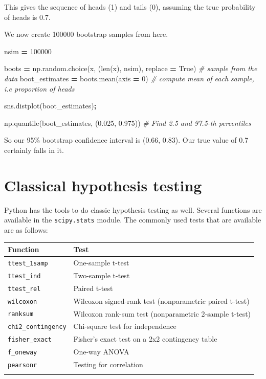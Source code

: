 \documentclass[
  letterpaper,
]{scrbook}
\newenvironment{Shaded}{\begin{snugshade}}{\end{snugshade}}
\newcommand{\BuiltInTok}[1]{#1}
\newcommand{\CommentTok}[1]{\textcolor[rgb]{0.56,0.35,0.01}{\textit{#1}}}
\newcommand{\DecValTok}[1]{\textcolor[rgb]{0.00,0.00,0.81}{#1}}
\newcommand{\FloatTok}[1]{\textcolor[rgb]{0.00,0.00,0.81}{#1}}
\newcommand{\NormalTok}[1]{#1}
\newcommand{\OperatorTok}[1]{\textcolor[rgb]{0.81,0.36,0.00}{\textbf{#1}}}
\newcommand{\VariableTok}[1]{\textcolor[rgb]{0.00,0.00,0.00}{#1}}
\begin{document}
This gives the sequence of heads (1) and tails (0), assuming the true probability of heads is 0.7.

We now create 100000 bootstrap samples from here.

\begin{Shaded}
\begin{Highlighting}[]
\NormalTok{nsim }\OperatorTok{=} \DecValTok{100000}

\NormalTok{boots }\OperatorTok{=}\NormalTok{ np.random.choice(x, (}\BuiltInTok{len}\NormalTok{(x), nsim), replace }\OperatorTok{=} \VariableTok{True}\NormalTok{) }\CommentTok{\# sample from the data}
\NormalTok{boot\_estimates }\OperatorTok{=}\NormalTok{ boots.mean(axis }\OperatorTok{=} \DecValTok{0}\NormalTok{) }\CommentTok{\# compute mean of each sample, i.e proportion of heads}

\NormalTok{sns.distplot(boot\_estimates)}\OperatorTok{;}
\end{Highlighting}
\end{Shaded}

\begin{Shaded}
\begin{Highlighting}[]
\NormalTok{np.quantile(boot\_estimates, (}\FloatTok{0.025}\NormalTok{, }\FloatTok{0.975}\NormalTok{)) }\CommentTok{\# Find 2.5 and 97.5{-}th percentiles}
\end{Highlighting}
\end{Shaded}

So our 95\% bootstrap confidence interval is (0.66, 0.83). Our true value of 0.7 certainly falls in it.

\hypertarget{classical-hypothesis-testing}{%
\section{Classical hypothesis testing}\label{classical-hypothesis-testing}}

Python has the tools to do classic hypothesis testing as well. Several functions are available in the \texttt{scipy.stats} module. The commonly used tests that are available are as follows:

\begin{longtable}[]{@{}ll@{}}
\toprule
Function & Test\tabularnewline
\midrule
\endhead
\texttt{ttest\_1samp} & One-sample t-test\tabularnewline
\texttt{ttest\_ind} & Two-sample t-test\tabularnewline
\texttt{ttest\_rel} & Paired t-test\tabularnewline
\texttt{wilcoxon} & Wilcoxon signed-rank test (nonparametric paired t-test)\tabularnewline
\texttt{ranksum} & Wilcoxon rank-sum test (nonparametric 2-sample t-test)\tabularnewline
\texttt{chi2\_contingency} & Chi-square test for independence\tabularnewline
\texttt{fisher\_exact} & Fisher's exact test on a 2x2 contingency table\tabularnewline
\texttt{f\_oneway} & One-way ANOVA\tabularnewline
\texttt{pearsonr} & Testing for correlation\tabularnewline
&\tabularnewline
\bottomrule
\end{longtable}
\end{document}
